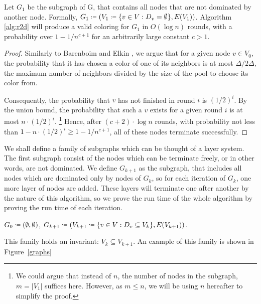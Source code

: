 \begin{lemma}
\label{theorem:r2dzeit}
	Let $G_1$ be the subgraph of G, that contains all nodes that are not dominated by another node. Formally, $G_1 \defines (V_1 \defines \{v \in V : D_v = \emptyset \}, E(V_1))$. Algorithm \ref{alg:r2d} will produce a valid coloring for $G_1$ in $O(\log n)$ rounds, with a probability over $1-1/n^{c+1}$ for an arbitrarily large constant $c>1$.
\end{lemma}
\begin{proof}
	Similarly to Barenboim and Elkin \cite[p. 102]{be-dcg-13}, we argue that for a given node $v \in V_0$, the probability that it has chosen a color of one of its neighbors is at most $\Delta / 2\Delta$, the maximum number of neighbors divided by the size of the pool to choose its color from.
	
	Consequently, the probability that $v$ has not finished in round $i$ is $(1/2)^i$. By the union bound, the probability that such a $v$ exists for a given round $i$ is at most $n \cdot (1/2)^i$. \footnote{We could argue that instead of $n$, the number of nodes in the subgraph, $m = |V_1|$ suffices here.  However, as $m \leq n$, we will be using $n$ hereafter to simplify the proof.}  Hence, after $(c+2) \cdot \log n$ rounds, with probability not less than $1-n \cdot (1/2)^i \geq 1-1/n^{c+1}$, all of these nodes terminate successfully.
\end{proof}

We shall define a family of subgraphs which can be thought of a layer system. The first subgraph consist of the nodes which can be terminate freely, or in other words, are not dominated. We define $G_{k+1}$ as the subgraph, that includes all nodes which are dominated only by nodes of $G_k$, so for each iteration of $G_k$, one more layer of nodes are added. These layers will terminate one after another by the nature of this algorithm, so we prove the run time of the whole algorithm by proving the run time of each iteration.

\begin{definition} $G_0 \defines (\emptyset, \emptyset)$, 
$G_{k+1} \defines (V_{k+1} \defines \{v \in V : D_v \subseteq V_k\}, E(V_{k+1}))$.
\end{definition}
This family holds an invariant: $V_k \subseteq V_{k+1}$. An example of this family is shown in Figure~\ref{graphs}


